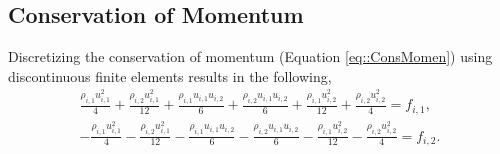 \documentclass{article}
\begin{document}
\subsection{Conservation of Momentum}
Discretizing the conservation of momentum (Equation \ref{eq::ConsMomen}) using discontinuous finite elements results in the following,
\begin{align}
\label{eq::LDFEM-MomenLHS-1}
\frac{\rho_{i,1}u_{i,1}^2}{4} + \frac{\rho_{i,2}u_{i,1}^2}{12} + \frac{\rho_{i,1}u_{i,1}u_{i,2}}{6} + \frac{\rho_{i,2}u_{i,1}u_{i,2}}{6} + \frac{\rho_{i,1}u_{i,2}^2}{12} + \frac{\rho_{i,2}u_{i,2}^2}{4} = f_{i,1},\\[5pt]
-\frac{\rho_{i,1}u_{i,1}^2}{4} - \frac{\rho_{i,2}u_{i,1}^2}{12} - \frac{\rho_{i,1}u_{i,1}u_{i,2}}{6} - \frac{\rho_{i,2}u_{i,1}u_{i,2}}{6} - \frac{\rho_{i,1}u_{i,2}^2}{12} - \frac{\rho_{i,2}u_{i,2}^2}{4} = f_{i,2}.
\end{align}
\end{document}
